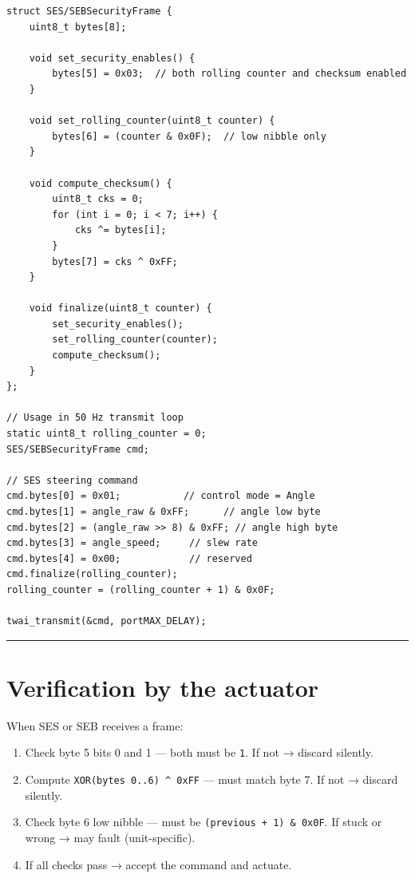\documentclass[12pt,a4paper,oneside]{report}
\providecommand{\tightlist}{\setlength{\itemsep}{0pt}\setlength{\parskip}{0pt}}
\begin{document}
\begin{verbatim}
struct SES/SEBSecurityFrame {
    uint8_t bytes[8];

    void set_security_enables() {
        bytes[5] = 0x03;  // both rolling counter and checksum enabled
    }

    void set_rolling_counter(uint8_t counter) {
        bytes[6] = (counter & 0x0F);  // low nibble only
    }

    void compute_checksum() {
        uint8_t cks = 0;
        for (int i = 0; i < 7; i++) {
            cks ^= bytes[i];
        }
        bytes[7] = cks ^ 0xFF;
    }

    void finalize(uint8_t counter) {
        set_security_enables();
        set_rolling_counter(counter);
        compute_checksum();
    }
};

// Usage in 50 Hz transmit loop
static uint8_t rolling_counter = 0;
SES/SEBSecurityFrame cmd;

// SES steering command
cmd.bytes[0] = 0x01;           // control mode = Angle
cmd.bytes[1] = angle_raw & 0xFF;      // angle low byte
cmd.bytes[2] = (angle_raw >> 8) & 0xFF; // angle high byte
cmd.bytes[3] = angle_speed;     // slew rate
cmd.bytes[4] = 0x00;            // reserved
cmd.finalize(rolling_counter);
rolling_counter = (rolling_counter + 1) & 0x0F;

twai_transmit(&cmd, portMAX_DELAY);
\end{verbatim}

\begin{center}\rule{0.5\linewidth}{0.5pt}\end{center}

\section{Verification by the actuator}\label{verification-by-the-actuator}

When SES or SEB receives a frame:

\begin{enumerate}
\def\labelenumi{\arabic{enumi}.}
\tightlist
\item
  Check byte 5 bits 0 and 1 --- both must be \texttt{1}. If not → discard
  silently.
\item
  Compute \texttt{XOR(bytes\ 0..6)\ \^{}\ 0xFF} --- must match byte 7. If not →
  discard silently.
\item
  Check byte 6 low nibble --- must be \texttt{(previous\ +\ 1)\ \&\ 0x0F}. If
  stuck or wrong → may fault (unit-specific).
\item
  If all checks pass → accept the command and actuate.
\end{enumerate}
\end{document}

